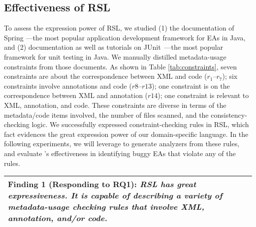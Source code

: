 

  \vspace{-.5em}
\subsection{Effectiveness of RSL}\label{ss:eval-effect-rsl}

To assess the expression power of RSL, we studied (1) the documentation of Spring \cite{spring}---the most popular application development framework for EAs in Java, and (2) documentation as well as tutorials on JUnit~\cite{junit-doc,junit-tutorial,how-to-junit,software-testing}---the most popular framework for unit testing in Java. 
We manually distilled \totalRule metadata-usage constraints from those documents. As shown in Table \ref{tab:constraints}, seven constraints are about the correspondence between XML and code ($r_1$--$r_7$); six constraints involve annotations and code ($r8$--$r13$); one constraint is on the correspondence between XML and annotation ($r14$); one constraint is relevant to XML, annotation, and code.
These constraints are diverse in terms of the metadata/code items involved, the number of files scanned, and the consistency-checking logic. We successfully expressed constraint-checking rules in RSL, which fact  evidences the great expression power of our domain-specific language. In the following experiments, we will leverage \tool to generate analyzers from these rules, and evaluate \tool's effectiveness in identifying buggy EAs that violate any of the rules.

\vspace{0.5em}
\noindent\begin{tabular}{|p{13.6cm}|}
	\hline
	\textbf{Finding 1 (Responding to RQ1):} \emph{RSL has great expressiveness. It is capable of describing a variety of metadata-usage checking rules that involve XML, annotation, and/or code.}
	\\
	\hline
\end{tabular}




